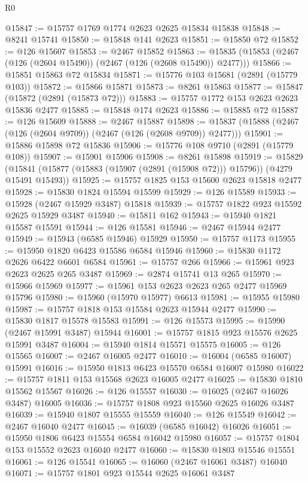 \begin{lexlean}{R0}
\begin{coremodule}
@15847 := @15757 @1769 @1774 @2623 @2625 @15834 @15838
@15848 := @8241 @15741
@15850 := @15848 @141 @2623
@15851 := @15850 @72
@15852 := @126 @15607
@15853 := @2467 @15852
@15863 := @15835 (@15853 (@2467 (@126 (@2604 @15490)) (@2467 (@126 (@2608 @15490)) @2477)))
@15866 := @15851 @15863 @72 @15834
@15871 := @15776 @103 @15681 (@2891 (@15779 @103))
@15872 := @15866 @15871
@15873 := @8261 @15863
@15877 := @15847 (@15872 (@2891 (@15873 @72)))
@15883 := @15757 @1772 @153 @2623 @2623 @15836 @2477
@15885 := @15848 @174 @2623
@15886 := @15885 @72
@15887 := @126 @15609
@15888 := @2467 @15887
@15898 := @15837 (@15888 (@2467 (@126 (@2604 @9709)) (@2467 (@126 (@2608 @9709)) @2477)))
@15901 := @15886 @15898 @72 @15836
@15906 := @15776 @108 @9710 (@2891 (@15779 @108))
@15907 := @15901 @15906
@15908 := @8261 @15898
@15919 := @15829
    (@15841 (@15877 (@15883 (@15907 (@2891 (@15908 @72))) @15796)) (@4279 @15491 @15493))
@15925 := @15757 @1825 @153 @15600 @2623 @15818 @2477
@15928 := @15830 @1824 @15594 @15599
@15929 := @126 @15589
@15933 := @15928 (@2467 @15929 @3487) @15818
@15939 := @15757 @1822 @923 @15592 @2625 @15929 @3487
@15940 := @15811 @162
@15943 := @15940 @1821 @15587 @15591
@15944 := @126 @15581
@15946 := @2467 @15944 @2477
@15949 := @15943 (@6585 @15946) @15929
@15950 := @15757 @1173
@15955 := @15950 @1820 @6423 @15586 @6584 @15946
@15960 := @15830 @1172 @2626 @6422 @6601 @6584
@15961 := @15757 @266
@15966 := @15961 @923 @2623 @2625 @265 @3487
@15969 := @2874 @15741 @13 @265
@15970 := @15966 @15969
@15977 := @15961 @153 @2623 @2623 @265 @2477 @15969 @15796
@15980 := @15960 (@15970 @15977) @6613
@15981 := @15955 @15980
@15987 := @15757 @1818 @153 @15584 @2623 @15944 @2477
@15990 := @15830 @1817 @15578 @15583
@15991 := @126 @15573
@15995 := @15990 (@2467 @15991 @3487) @15944
@16001 := @15757 @1815 @923 @15576 @2625 @15991 @3487
@16004 := @15940 @1814 @15571 @15575
@16005 := @126 @15565
@16007 := @2467 @16005 @2477
@16010 := @16004 (@6585 @16007) @15991
@16016 := @15950 @1813 @6423 @15570 @6584 @16007 @15980
@16022 := @15757 @1811 @153 @15568 @2623 @16005 @2477
@16025 := @15830 @1810 @15562 @15567
@16026 := @126 @15557
@16030 := @16025 (@2467 @16026 @3487) @16005
@16036 := @15757 @1808 @923 @15560 @2625 @16026 @3487
@16039 := @15940 @1807 @15555 @15559
@16040 := @126 @15549
@16042 := @2467 @16040 @2477
@16045 := @16039 (@6585 @16042) @16026
@16051 := @15950 @1806 @6423 @15554 @6584 @16042 @15980
@16057 := @15757 @1804 @153 @15552 @2623 @16040 @2477
@16060 := @15830 @1803 @15546 @15551
@16061 := @126 @15541
@16065 := @16060 (@2467 @16061 @3487) @16040
@16071 := @15757 @1801 @923 @15544 @2625 @16061 @3487

\end{coremodule}
\end{lexlean}
